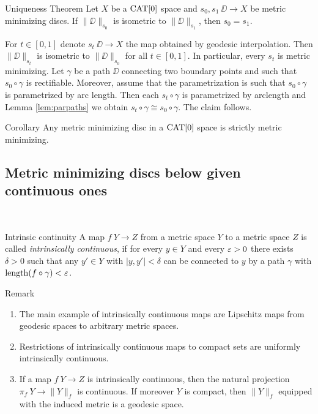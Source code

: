 \documentclass[a4paper,10pt]{amsart}
\begin{document}
\begin{thm}{Uniqueness Theorem}\label{prop:strict-mm}
Let $X$ be a $\mathop{\rm CAT}\nolimits[0]$ space and $s_0, s_1\:\DD\to X$ be metric minimizing discs. If 
$\|\DD\|_{s_0}$ is isometric to $\|\DD\|_{s_1}$, then $s_0=s_1$.
\end{thm}

For $t\in[0,1]$ denote $s_t\:\DD\to X$ the map obtained by geodesic interpolation. Then
$\|\DD\|_{s_t}$ is isometric to $\|\DD\|_{s_0}$ for all $t\in[0,1]$. In particular, every $s_t$ is metric minimizing.
Let $\gamma$ be a path $\DD$ connecting two boundary points and such that $s_0\circ\gamma$ is rectifiable.
Moreover, assume that the parametrization is such that $s_0\circ\gamma$ is parametrized by arc length. 
Then each 
$s_t\circ\gamma$ is parametrized by arclength and Lemma \ref{lem:parpaths} we obtain $s_t\circ\gamma\cong s_0\circ\gamma$.
The claim follows.
\qeds



\begin{thm}{Corollary}\label{prop:strict-mm}
Any metric minimizing disc in a $\mathop{\rm CAT}\nolimits[0]$ space is strictly metric minimizing.
\end{thm}



\subsection{Metric minimizing discs below given continuous ones}~
\medskip
\begin{thm}{Intrinsic continuity}
A map $f\:Y\to Z$ from a metric space $Y$ to a metric space
 $Z$ is called
{\em intrinsically continuous}, if for every $y\in Y$ 
and every $\varepsilon>0$ there
exists $\delta>0$ such that any  $y'\in Y$
with $|y,y'|<\delta$ can be connected to $y$ by a path $\gamma$ 
with $\operatorname{length}(f\circ\gamma)<\varepsilon$.
\end{thm}

\begin{thm}{Remark}
\begin{enumerate}
 \item The main example of intrinsically continuous maps are Lipschitz
maps from geodesic spaces to arbitrary metric spaces.
\item Restrictions of intrinsically continuous maps to compact sets are uniformly intrinsically continuous. 
\item If a map $f\:Y\to Z$ is intrinsically continuous, then 
the natural projection $\pi_f\:Y\rightarrow \|Y\|_f$ is continuous. If
moreover $Y$ is compact, then $\|Y\|_f$ equipped with the induced 
metric is a geodesic space.
\end{enumerate}
\end{thm}
\end{document}
